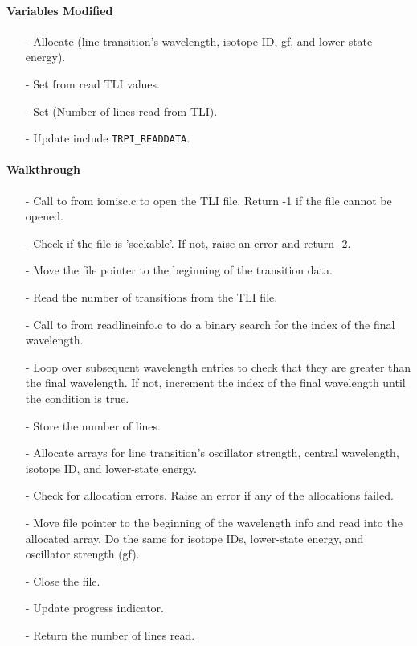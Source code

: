 \documentclass[letterpaper,12pt]{article}
\begin{document}
\paragraph{Variables Modified}
\begin{enumerate}[leftmargin=10pt, noitemsep, parsep=0pt, topsep=0ex]
\item[-] Allocate  (line-transition's wavelength,
  isotope ID, gf, and lower state energy).
\item[-] Set  from read TLI values.
\item[-] Set  (Number of lines read from TLI).
\item[-] Update  include {\tt TRPI\_READDATA}.
\end{enumerate}

\paragraph{Walkthrough} 
\begin{enumerate}[leftmargin=10pt, noitemsep, parsep=0pt, topsep=0ex]
\item[-] Call to  from iomisc.c to open the TLI file. Return -1 if the file cannot be opened.
\item[-] Check if the file is 'seekable'. If not, raise an error and return -2.
\item[-] Move the file pointer to the beginning of the transition data.
\item[-] Read the number of transitions from the TLI file.
\item[-] Call to  from readlineinfo.c to do a binary search for the index of the final wavelength.
\item[-] Loop over subsequent wavelength entries to check that they are greater than the final wavelength. If not, increment the index of the final wavelength until the condition is true.
\item[-] Store the number of lines.
\item[-] Allocate arrays for line transition's oscillator strength, central wavelength, isotope ID, and lower-state energy.
\item[-] Check for allocation errors. Raise an error if any of the allocations failed.
\item[-] Move file pointer to the beginning of the wavelength info and read into the allocated array. Do the same for isotope IDs, lower-state energy, and oscillator strength (gf).
\item[-] Close the file.
\item[-] Update progress indicator.
\item[-] Return the number of lines read.
\end{enumerate}
\end{document}
